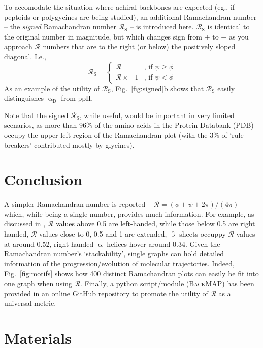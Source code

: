 \documentclass[fleqn,10pt,lineno]{wlpeerj} %
\newcommand{\Fig}[1]{Fig.~\ref{#1}}
\newcommand{\gname}{BackMAP}
\newcommand{\pname}{\textsc{\gname}\xspace}
\newcommand{\rr}{$\mathcal{R}$\xspace}
\begin{document}
To accomodate the situation where achiral backbones are expected (eg., if peptoids or polygycines are being studied), an additional Ramachandran number -- the \textit{signed} Ramachandran number $\mathcal{R}_\textrm{S}$ -- is introduced here. $\mathcal{R}_\textrm{S}$ is identical to the original number in magnitude, but which changes sign from $+$ to $-$ as you approach $\mathcal{R}$ numbers that are to the right (or below) the positively sloped diagonal. I.e., 
\begin{equation}
\mathcal{R}_\textrm{S} = 
\begin{cases}
    \mathcal{R}         &\text{, if } \psi \geq \phi  \\
    \mathcal{R}\times-1 &\text{, if } \psi   <  \phi
\end{cases}\label{eqn:signed}
\end{equation}
As an example of the utility of $\mathcal{R}_\textrm{S}$, \Fig{fig:signed}b shows that $\mathcal{R}_\textrm{S}$ easily distinguishes $\upalpha_\textrm{D}$ from $\textrm{ppII}$.

Note that the signed $\mathcal{R}_\textrm{S}$, while useful, would be important in very limited scenarios, as more than 96\% of the amino acids in the Protein Databank (PDB) occupy the upper-left region of the Ramachandran plot (with the 3\% of `rule breakers' contributed mostly by glycines).

\section*{Conclusion}

A simpler Ramachandran number is reported -- $\mathcal{R} = (\phi+\psi+2\pi)/(4\pi)$ -- which, while being a single number, provides much information. For example, as discussed in \cite{Mannige2016}, \rr values above 0.5 are left-handed, while those below 0.5 are right handed, \rr values close to 0, 0.5 and 1 are extended, $\upbeta$-sheets occuppy \rr values at around 0.52, right-handed $\upalpha$-helices hover around 0.34. Given the Ramachandran number's `stackability', single graphs can hold detailed information of the progression/evolution of molecular trajectories. Indeed, \Fig{fig:motifs} shows how 400 distinct Ramachandran plots can easily be fit into one graph when using \rr. Finally, a python script/module (\pname) has been provided in an online \href{https://github.com/ranjanmannige/\gname}{GitHub repository} to promote the utility of \rr as a universal metric.

\section*{Materials}
\end{document}
